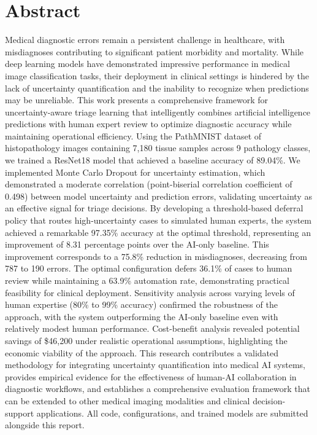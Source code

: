 \documentclass[10pt,a4paper]{article}
\begin{document}
\section*{Abstract}
\normalsize
Medical diagnostic errors remain a persistent challenge in healthcare, with misdiagnoses contributing to significant patient morbidity and mortality. While deep learning models have demonstrated impressive performance in medical image classification tasks, their deployment in clinical settings is hindered by the lack of uncertainty quantification and the inability to recognize when predictions may be unreliable. This work presents a comprehensive framework for uncertainty-aware triage learning that intelligently combines artificial intelligence predictions with human expert review to optimize diagnostic accuracy while maintaining operational efficiency. Using the PathMNIST dataset of histopathology images containing 7,180 tissue samples across 9 pathology classes, we trained a ResNet18 model that achieved a baseline accuracy of 89.04\%. We implemented Monte Carlo Dropout for uncertainty estimation, which demonstrated a moderate correlation (point-biserial correlation coefficient of 0.498) between model uncertainty and prediction errors, validating uncertainty as an effective signal for triage decisions. By developing a threshold-based deferral policy that routes high-uncertainty cases to simulated human experts, the system achieved a remarkable 97.35\% accuracy at the optimal threshold, representing an improvement of 8.31 percentage points over the AI-only baseline. This improvement corresponds to a 75.8\% reduction in misdiagnoses, decreasing from 787 to 190 errors. The optimal configuration defers 36.1\% of cases to human review while maintaining a 63.9\% automation rate, demonstrating practical feasibility for clinical deployment. Sensitivity analysis across varying levels of human expertise (80\% to 99\% accuracy) confirmed the robustness of the approach, with the system outperforming the AI-only baseline even with relatively modest human performance. Cost-benefit analysis revealed potential savings of \$46,200 under realistic operational assumptions, highlighting the economic viability of the approach. This research contributes a validated methodology for integrating uncertainty quantification into medical AI systems, provides empirical evidence for the effectiveness of human-AI collaboration in diagnostic workflows, and establishes a comprehensive evaluation framework that can be extended to other medical imaging modalities and clinical decision-support applications. All code, configurations, and trained models are submitted alongside this report. 
\end{document}
